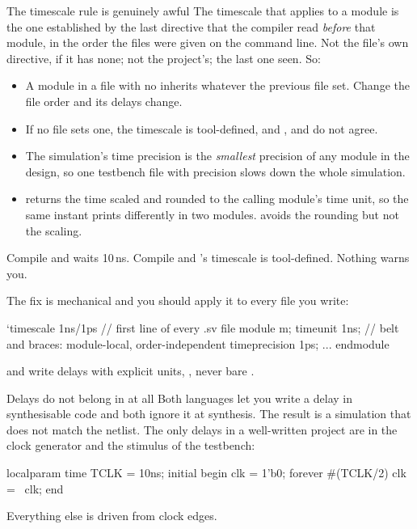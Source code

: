 \begin{gotcha}{The timescale rule is genuinely awful}
The timescale that applies to a module is the one established by the last
 directive that the compiler read \emph{before} that
module, in the order the files were given on the command line. Not the file's
own directive, if it has none; not the project's; the last one seen. So:

\begin{itemize}
  \item A module in a file with no  inherits whatever the
        previous file set. Change the file order and its delays change.
  \item If no file sets one, the timescale is tool-defined, and
        ,  and  do not agree.
  \item The simulation's time precision is the \emph{smallest} precision of any
        module in the design, so one testbench file with  precision
        slows down the whole simulation.
  \item {} returns the time scaled and rounded to the calling
        module's time unit, so the same instant prints differently in two
        modules.  avoids the rounding but not the scaling.
\end{itemize}

Compile  and  waits 10\,ns. Compile 
and 's timescale is tool-defined. Nothing warns you.

The fix is mechanical and you should apply it to every file you write:
\begin{svcode}
`timescale 1ns/1ps        // first line of every .sv file
module m;
  timeunit      1ns;      // belt and braces: module-local, order-independent
  timeprecision 1ps;
  ...
endmodule
\end{svcode}
and write delays with explicit units, , never bare .
\end{gotcha}

\begin{notebox}{Delays do not belong in \RTL{} at all}
Both languages let you write a delay in synthesisable code and both ignore it
at synthesis. The result is a simulation that does not match the netlist. The
only delays in a well-written project are in the clock generator and the
stimulus of the testbench:
\begin{svcode}
localparam time TCLK = 10ns;
initial begin
  clk = 1'b0;
  forever #(TCLK/2) clk = ~clk;
end
\end{svcode}
Everything else is driven from clock edges.
\end{notebox}

